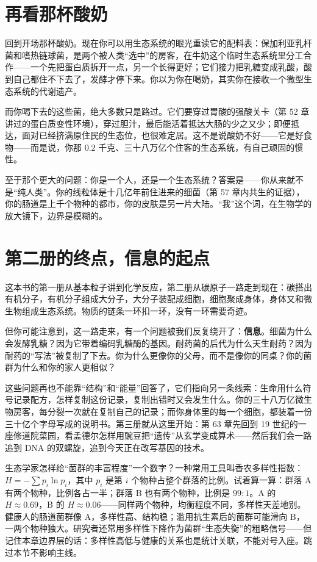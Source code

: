 \section{再看那杯酸奶}

回到开场那杯酸奶。现在你可以用生态系统的眼光重读它的配料表：保加利亚乳杆菌和嗜热链球菌，是两个被人类“选中”的房客，在牛奶这个临时生态系统里分工合作——一个先把蛋白质拆开一点，另一个长得更好；它们接力把乳糖变成乳酸，酸到自己都住不下去了，发酵才停下来。你以为你在喝奶，其实你在接收一个微型生态系统的代谢遗产。

而你喝下去的这些菌，绝大多数只是路过。它们要穿过胃酸的强酸关卡（第 52 章讲过的蛋白质变性环境），穿过胆汁，最后能活着抵达大肠的少之又少；即便抵达，面对已经挤满原住民的生态位，也很难定居。这不是说酸奶不好——它是好食物——而是说，你那 $0.2$ 千克、三十八万亿个住客的生态系统，有自己顽固的惯性。

至于那个更大的问题：你是一个人，还是一个生态系统？答案是——你从来就不是“纯人类”。你的线粒体是十几亿年前住进来的细菌（第 57 章内共生的证据），你的肠道是上千个物种的都市，你的皮肤是另一片大陆。“我”这个词，在生物学的放大镜下，边界是模糊的。

\section{第二册的终点，信息的起点}

这本书的第一册从基本粒子讲到化学反应，第二册从碳原子一路走到现在：碳搭出有机分子，有机分子组成大分子，大分子装配成细胞，细胞聚成身体，身体又和微生物组成生态系统。物质的链条一环扣一环，没有一环需要奇迹。

但你可能注意到，这一路走来，有一个问题被我们反复绕开了：\textbf{信息}。细菌为什么会发酵乳糖？因为它带着编码乳糖酶的基因。耐药菌的后代为什么天生耐药？因为耐药的“写法”被复制了下去。你为什么更像你的父母，而不是像你的同桌？你的菌群为什么和你的家人更相似？

这些问题再也不能靠“结构”和“能量”回答了，它们指向另一条线索：生命用什么符号记录配方，怎样复制这份记录，复制出错时又会发生什么。你的三十八万亿微生物房客，每分裂一次就在复制自己的记录；而你身体里的每一个细胞，都装着一份三十亿个字母写成的说明书。第三册就从这里开始：第 63 章先回到 19 世纪的一座修道院菜园，看孟德尔怎样用豌豆把“遗传”从玄学变成算术——然后我们会一路追到 DNA 的双螺旋，追到今天正在改写基因的技术。

\begin{tiaozhan}
生态学家怎样给“菌群的丰富程度”一个数字？一种常用工具叫香农多样性指数：$H=-\sum p_i \ln p_i$，其中 $p_i$ 是第 $i$ 个物种占整个群落的比例。试着算一算：群落 A 有两个物种，比例各占一半；群落 B 也有两个物种，比例是 $99:1$。A 的 $H\approx 0.69$，B 的 $H\approx 0.06$——同样两个物种，均衡程度不同，多样性天差地别。健康人的肠道菌群像 A，多样性高、结构稳；滥用抗生素后的菌群可能滑向 B，一两个物种独大。研究者还常用多样性下降作为菌群“生态失衡”的粗略信号——但记住本章边界层的话：多样性高低与健康的关系也是统计关联，不能对号入座。跳过本节不影响主线。
\end{tiaozhan}

